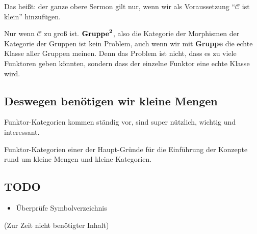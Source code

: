 \documentclass[a4paper]{amsart}
\theoremstyle{definition}
\newcommand{\CC}{\ensuremath{\mathcal{ C }}}
\begin{document}
Das heißt: der ganze obere Sermon gilt nur, wenn wir als Voraussetzung "`$\CC$ ist klein"' hinzufügen.

Nur wenn $\CC$ zu groß ist. $\text{\textbf{Gruppe}}^{\boldsymbol{2}}$, also die Kategorie der Morphismen der Kategorie der Gruppen ist kein Problem, auch wenn wir mit \textbf{Gruppe} die echte Klasse aller Gruppen meinen. Denn das Problem ist nicht, dass es zu viele Funktoren geben könnten, sondern dass der einzelne Funktor eine echte Klasse wird.

\subsection{Deswegen benötigen wir kleine Mengen}
Funktor-Kategorien kommen ständig vor, sind super nützlich, wichtig und interessant.

Funktor-Kategorien einer der Haupt-Gründe für die Einführung der Konzepte rund um kleine Mengen und kleine Kategorien. 

\begin{backup}
\section{TODO}
\begin{itemize}
     \item Überprüfe Symbolverzeichnis
\end{itemize}

\end{backup}

\begin{backup}
    (Zur Zeit nicht benötigter Inhalt)
\end{backup}
\end{document}
